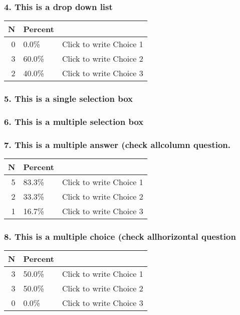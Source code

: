\documentclass{article}\usepackage[]{graphicx}\usepackage[]{color}
\begin{document}
\hfill \break \hfill \break
\subsubsection*{4.
This is a drop down list}


\begin{tabular}{r|l|l}
\hline
N & Percent & \\
\hline
0 & 0.0\% & Click to write Choice 1\\
\hline
3 & 60.0\% & Click to write Choice 2\\
\hline
2 & 40.0\% & Click to write Choice 3\\
\hline
\end{tabular}


\hfill \break \hfill \break
\subsubsection*{5.
This is a single selection box}


\hfill \break \hfill \break
\subsubsection*{6.
This is a multiple selection box}


\hfill \break \hfill \break
\subsubsection*{7.
This is a multiple answer (check allcolumn question.}


\begin{tabular}{r|l|l}
\hline
N & Percent & \\
\hline
5 & 83.3\% & Click to write Choice 1\\
\hline
2 & 33.3\% & Click to write Choice 2\\
\hline
1 & 16.7\% & Click to write Choice 3\\
\hline
\end{tabular}


\hfill \break \hfill \break
\subsubsection*{8.
This is a multiple choice (check allhorizontal question}


\begin{tabular}{r|l|l}
\hline
N & Percent & \\
\hline
3 & 50.0\% & Click to write Choice 1\\
\hline
3 & 50.0\% & Click to write Choice 2\\
\hline
0 & 0.0\% & Click to write Choice 3\\
\hline
\end{tabular}
\end{document}

